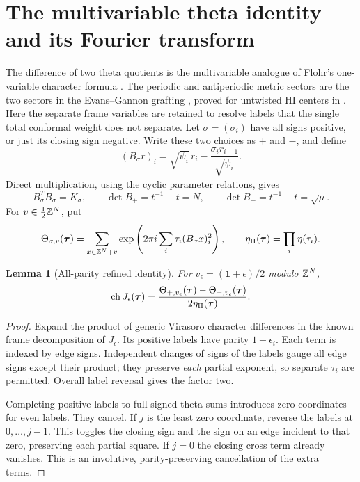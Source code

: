 \documentclass[11pt,a4paper]{article}
\numberwithin{equation}{section}
\newtheorem{lemma}[theorem]{Lemma}
\theoremstyle{definition}\newtheorem{definition}[theorem]{Definition}
\theoremstyle{remark}\newtheorem{remark}[theorem]{Remark}
\newcommand{\one}{\mathbf1}\newcommand{\B}{\mathcal B}\newcommand{\W}{W_N}
\begin{document}
\section{The multivariable theta identity and its Fourier transform}
\label{sec:multivariable-theta}
\label{g:sec:theta}
The difference of two theta quotients is the multivariable analogue
of Flohr's one-variable character formula
\cite[equations (4.2)--(4.5) and Table 4.2]{flohr1993}.
The periodic and antiperiodic metric sectors are the two sectors
in the Evans--Gannon grafting \cite[Section 3.3]{evansgannon2011},
proved for untwisted HI centers in \cite[Theorem 5.1]{gsy}.
Here the separate frame variables are retained to resolve labels
that the single total conformal weight does not separate.
Let $\sigma=(\sigma_i)$ have all signs positive, or just its closing
sign negative. Write these two choices as $+$ and $-$, and define
\[
 (B_\sigma r)_i=\sqrt{\psi_i}\,r_i
                  -\frac{\sigma_i r_{i+1}}{\sqrt{\psi_i}}.
\]
Direct multiplication, using the cyclic parameter relations,
gives
\[
 B_\sigma^TB_\sigma=K_\sigma,\qquad
 \det B_+=t^{-1}-t=N,\qquad
 \det B_-=t^{-1}+t=\sqrt\mu.
\]
For $v\in\frac12\mathbb Z^N$, put
\[
 \Theta_{\sigma,v}(\boldsymbol\tau)
 =\sum_{x\in\mathbb Z^N+v}
       \exp\left(2\pi i\sum_i\tau_i(B_\sigma x)_i^2\right),
 \qquad
 \eta_\Pi(\boldsymbol\tau)=\prod_i\eta(\tau_i).
\]

\begin{lemma}[All-parity refined identity]\label{g:lem:theta}
For $v_\epsilon=(\one+\epsilon)/2$ modulo $\mathbb Z^N$,
\[
 \operatorname{ch} J_\epsilon(\boldsymbol\tau)
   =\frac{\Theta_{+,v_\epsilon}(\boldsymbol\tau)
                  -\Theta_{-,v_\epsilon}(\boldsymbol\tau)}
                  {2\eta_\Pi(\boldsymbol\tau)}.
\]
\end{lemma}
\begin{proof}
Expand the product of generic Virasoro character differences in the
known frame decomposition of $J_\epsilon$. Its positive labels have
parity $1+\epsilon_i$. Each term is indexed by edge signs. Independent
changes of signs of the labels gauge all edge signs except their
product; they preserve \emph{each} partial exponent, so separate
$\tau_i$ are permitted. Overall label reversal gives the factor two.

Completing positive labels to full signed theta sums introduces zero
coordinates for even labels. They cancel. If $j$ is the least zero
coordinate, reverse the labels at $0,\ldots,j-1$. This toggles the
closing sign and the sign on an edge incident to that zero, preserving
each partial square. If $j=0$ the closing cross term already vanishes.
This is an involutive, parity-preserving cancellation of the extra
terms.
\end{proof}
\end{document}
